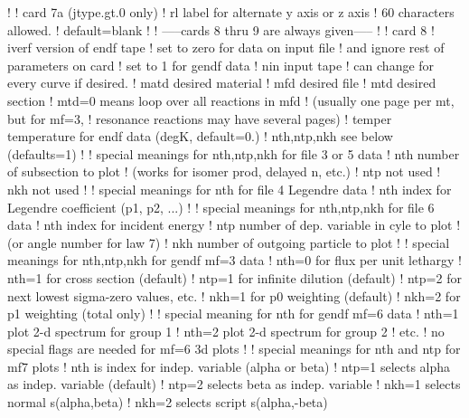 \begin{ccode}
   !
   !  card 7a  (jtype.gt.0 only)
   !     rl            label for alternate y axis or z axis
   !                   60 characters allowed.
   !                   default=blank
   !
   !  -----cards 8 thru 9 are always given-----
   !
   !  card 8
   !     iverf         version of endf tape
   !                     set to zero for data on input file
   !                       and ignore rest of parameters on card
   !                     set to 1 for gendf data
   !     nin           input tape
   !                   can change for every curve if desired.
   !     matd          desired material
   !     mfd           desired file
   !     mtd           desired section
   !                    mtd=0 means loop over all reactions in mfd
   !                    (usually one page per mt, but for mf=3,
   !                    resonance reactions may have several pages)
   !     temper        temperature for endf data (degK, default=0.)
   !     nth,ntp,nkh   see below (defaults=1)
   !
   !       special meanings for nth,ntp,nkh for file 3 or 5 data
   !            nth   number of subsection to plot
   !              (works for isomer prod, delayed n, etc.)
   !            ntp   not used
   !            nkh   not used
   !
   !       special meanings for nth for file 4 Legendre data
   !            nth   index for Legendre coefficient (p1, p2, ...)
   !
   !       special meanings for nth,ntp,nkh for file 6 data
   !            nth   index for  incident energy
   !            ntp   number of dep. variable in cyle to plot
   !                  (or angle number for law 7)
   !            nkh   number of outgoing particle to plot
   !
   !       special meanings for nth,ntp,nkh for gendf mf=3 data
   !            nth=0 for flux per unit lethargy
   !            nth=1 for cross section (default)
   !            ntp=1 for infinite dilution (default)
   !            ntp=2 for next lowest sigma-zero values, etc.
   !            nkh=1 for p0 weighting (default)
   !            nkh=2 for p1 weighting (total only)
   !
   !       special meaning for nth for gendf mf=6 data
   !            nth=1 plot 2-d spectrum for group 1
   !            nth=2 plot 2-d spectrum for group 2
   !              etc.
   !        no special flags are needed for mf=6 3d plots
   !
   !      special meanings for nth and ntp for mf7 plots
   !           nth is index for indep. variable (alpha or beta)
   !           ntp=1 selects alpha as indep. variable (default)
   !           ntp=2 selects beta as indep. variable
   !           nkh=1 selects normal s(alpha,beta)
   !           nkh=2 selects script s(alpha,-beta)

\end{ccode}
